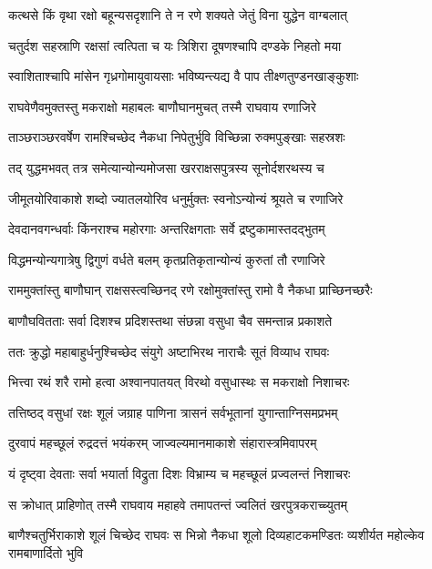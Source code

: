 \twolineshloka
{कत्थसे किं वृथा रक्षो बहून्यसदृशानि ते}
{न रणे शक्यते जेतुं विना युद्धेन वाग्बलात्} %

\twolineshloka
{चतुर्दश सहस्राणि रक्षसां त्वत्पिता च यः}
{त्रिशिरा दूषणश्चापि दण्डके निहतो मया} %

\twolineshloka
{स्वाशिताश्चापि मांसेन गृध्रगोमायुवायसाः}
{भविष्यन्त्यद्य वै पाप तीक्ष्णतुण्डनखाङ्कुशाः} %

\twolineshloka
{राघवेणैवमुक्तस्तु मकराक्षो महाबलः}
{बाणौघानमुचत् तस्मै राघवाय रणाजिरे} %

\twolineshloka
{ताञ्छराञ्छरवर्षेण रामश्चिच्छेद नैकधा}
{निपेतुर्भुवि विच्छिन्ना रुक्मपुङ्खाः सहस्रशः} %

\twolineshloka
{तद् युद्धमभवत् तत्र समेत्यान्योन्यमोजसा}
{खरराक्षसपुत्रस्य सूनोर्दशरथस्य च} %

\twolineshloka
{जीमूतयोरिवाकाशे शब्दो ज्यातलयोरिव}
{धनुर्मुक्तः स्वनोऽन्योन्यं श्रूयते च रणाजिरे} %

\twolineshloka
{देवदानवगन्धर्वाः किंनराश्च महोरगाः}
{अन्तरिक्षगताः सर्वे द्रष्टुकामास्तदद्भुतम्} %

\twolineshloka
{विद्धमन्योन्यगात्रेषु द्विगुणं वर्धते बलम्}
{कृतप्रतिकृतान्योन्यं कुरुतां तौ रणाजिरे} %

\twolineshloka
{राममुक्तांस्तु बाणौघान् राक्षसस्त्वच्छिनद् रणे}
{रक्षोमुक्तांस्तु रामो वै नैकधा प्राच्छिनच्छरैः} %

\twolineshloka
{बाणौघवितताः सर्वा दिशश्च प्रदिशस्तथा}
{संछन्ना वसुधा चैव समन्तान्न प्रकाशते} %

\twolineshloka
{ततः क्रुद्धो महाबाहुर्धनुश्चिच्छेद संयुगे}
{अष्टाभिरथ नाराचैः सूतं विव्याध राघवः} %

\twolineshloka
{भित्त्वा रथं शरै रामो हत्वा अश्वानपातयत्}
{विरथो वसुधास्थः स मकराक्षो निशाचरः} %

\twolineshloka
{तत्तिष्ठद् वसुधां रक्षः शूलं जग्राह पाणिना}
{त्रासनं सर्वभूतानां युगान्ताग्निसमप्रभम्} %

\twolineshloka
{दुरवापं महच्छूलं रुद्रदत्तं भयंकरम्}
{जाज्वल्यमानमाकाशे संहारास्त्रमिवापरम्} %

\twolineshloka
{यं दृष्ट्वा देवताः सर्वा भयार्ता विद्रुता दिशः}
{विभ्राम्य च महच्छूलं प्रज्वलन्तं निशाचरः} %

\twolineshloka
{स क्रोधात् प्राहिणोत् तस्मै राघवाय महाहवे}
{तमापतन्तं ज्वलितं खरपुत्रकराच्च्युतम्} %

\threelineshloka
{बाणैश्चतुर्भिराकाशे शूलं चिच्छेद राघवः}
{स भिन्नो नैकधा शूलो दिव्यहाटकमण्डितः}
{व्यशीर्यत महोल्केव रामबाणार्दितो भुवि} %

